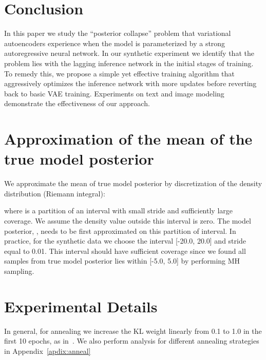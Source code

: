 \documentclass{article} \usepackage{iclr2019_conference,times}
\begin{document}
\section{Conclusion}
In this paper we study the ``posterior collapse'' problem that variational autoencoders experience when the model is parameterized by a strong autoregressive neural network. In our synthetic experiment we identify that the problem lies with the lagging inference network in the initial stages of training. To remedy this, we propose a simple yet effective training algorithm that aggressively optimizes the inference network with more updates before reverting back to basic VAE training. Experiments on text and image modeling demonstrate the effectiveness of our approach.



\newpage
\appendix
\section{Approximation of the mean of the true model posterior}\label{apdix:mean}
We approximate the mean of true model posterior  by discretization of the density distribution (Riemann integral):
 
 where  is a partition of an interval with small stride and sufficiently large coverage. We assume the density value outside this interval is zero. The model posterior, , needs to be first approximated on this partition of interval. In practice, for the synthetic data we choose the interval [-20.0, 20.0] and stride equal to 0.01. This interval should have sufficient coverage since we found all samples from true model posterior  lies within [-5.0, 5.0] by performing MH sampling.

\section{Experimental Details}
In general, for annealing we increase the KL weight linearly from 0.1 to 1.0 in the first 10 epochs, as in~\citet{kim2018semi}. We also perform analysis for different annealing strategies in Appendix~\ref{apdix:anneal}
\end{document}
